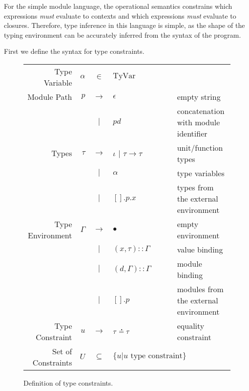 \documentclass{article}
\theoremstyle{definition}
\newcommand*{\vbar}{|}
\newcommand*{\cons}{::}
\newcommand*{\A}[1]{\overset{\,_{\mbox{\Large .}}}{#1}}
\newcommand*{\modid}{d}
\newcommand*{\TyVar}{\text{TyVar}}
\begin{document}
For the simple module language, the operational semantics constrains which expressions \emph{must} evaluate to contexts and which expressions \emph{must} evaluate to closures.
Therefore, type inference in this language is simple, as the shape of the typing environment can be accurately inferred from the syntax of the program.

First we define the syntax for type constraints.
\begin{figure}[h!]
  \centering
  \begin{tabular}{rrcll}
    Type Variable      & $\alpha$ & $\in$         & $\TyVar$                                                                 \\
    Module Path        & $p$      & $\rightarrow$ & $\epsilon$                       & empty string                          \\
                       &          & $\vbar$       & $p\modid$                        & concatenation with module identifier  \\
    Types              & $\tau$   & $\rightarrow$ & $\iota$ | $\tau\rightarrow\tau$  & unit/function types                   \\
                       &          & $\vbar$       & $\alpha$                         & type variables                        \\
                       &          & $\vbar$       & $[].p.x$                         & types from the external environment   \\
    Type Environment   & $\Gamma$ & $\rightarrow$ & $\bullet$                        & empty environment                     \\
                       &          & $\vbar$       & $(x,\tau)\cons \Gamma$           & value binding                         \\
                       &          & $\vbar$       & $(\modid,\Gamma)\cons \Gamma$    & module binding                        \\
                       &          & $\vbar$       & $[].p$                           & modules from the external environment \\
    Type Constraint    & $u$      & $\rightarrow$ & $\tau\A{=}\tau$                  & equality constraint                   \\
    Set of Constraints & $U$      & $\subseteq$   & $\{u|u\text{ type constraint}\}$
  \end{tabular}
  \caption{Definition of type constraints.}
  \label{fig:typeqdom}
\end{figure}
\end{document}
